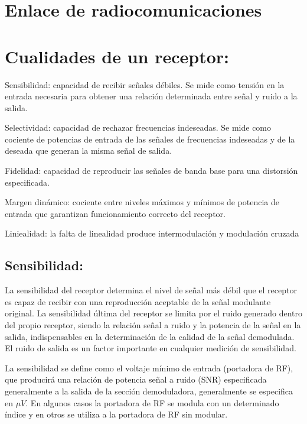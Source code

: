 \documentclass[a4paper,10pt,spanish]{report}
\let\sphinxpxdimen\pdfpxdimen\else\newdimen\sphinxpxdimen
\begin{document}
\section{Enlace de radiocomunicaciones}
\label{\detokenize{introduccion/sistemas:Enlace-de-radiocomunicaciones}}
\sphinxincludegraphics[width=1120\sphinxpxdimen,height=554\sphinxpxdimen]{{radio3}.png}


\section{Cualidades de un receptor:}
\label{\detokenize{introduccion/sistemas:Cualidades-de-un-receptor:}}
Sensibilidad: capacidad de recibir señales débiles. Se mide como tensión en la entrada necesaria para obtener una relación determinada entre señal y ruido a la salida.

Selectividad: capacidad de rechazar frecuencias indeseadas. Se mide como cociente de potencias de entrada de las señales de frecuencias indeseadas y de la deseada que generan la misma señal de salida.

Fidelidad: capacidad de reproducir las señales de banda base para una distorsión especificada.

Margen dinámico: cociente entre niveles máximos y mínimos de potencia de entrada que garantizan funcionamiento correcto del receptor.

Liniealidad: la falta de linealidad produce intermodulación y modulación cruzada


\subsection{Sensibilidad:}
\label{\detokenize{introduccion/sistemas:Sensibilidad:}}
La sensibilidad del receptor determina el nivel de señal más débil que el receptor es capaz de recibir con una reproducción aceptable de la señal modulante original. La sensibilidad última del receptor se limita por el ruido generado dentro del propio receptor, siendo la relación señal a ruido y la potencia de la señal en la salida, indispensables en la determinación de la calidad de la señal demodulada. El ruido de salida es un factor importante en cualquier medición de sensibilidad.

La sensibilidad se define como el voltaje mínimo de entrada (portadora de RF), que producirá una relación de potencia señal a ruido (SNR) especificada generalmente a la salida de la sección demoduladora, generalmente se especifica en \(\mu V\). En algunos casos la portadora de RF se modula con un determinado índice y en otros se utiliza a la portadora de RF sin modular.
\end{document}
